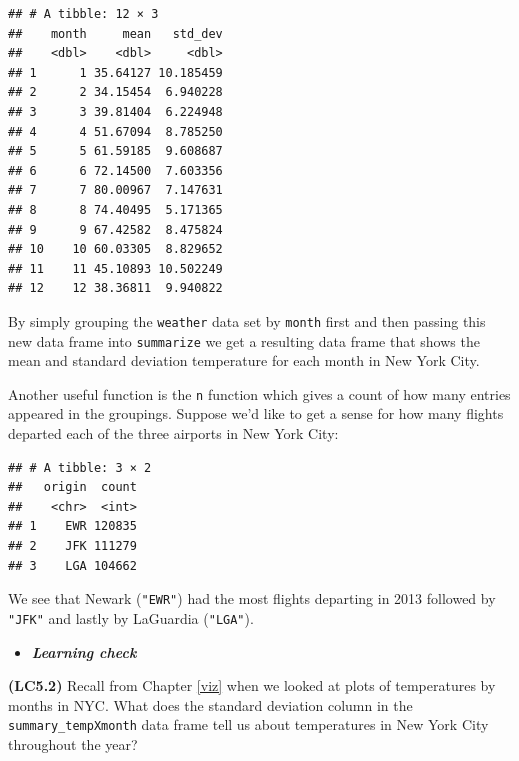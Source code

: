 \documentclass[]{tufte-book}
\newenvironment{Shaded}{\begin{snugshade}}{\end{snugshade}}
\newcommand{\KeywordTok}[1]{\textcolor[rgb]{0.13,0.29,0.53}{\textbf{{#1}}}}
\newcommand{\DataTypeTok}[1]{\textcolor[rgb]{0.13,0.29,0.53}{{#1}}}
\newcommand{\StringTok}[1]{\textcolor[rgb]{0.31,0.60,0.02}{{#1}}}
\newcommand{\NormalTok}[1]{{#1}}
\newenvironment{rmdblock}[1]
  {\begin{shaded*}
  \begin{itemize}
  \renewcommand{\labelitemi}{
    \raisebox{-.7\height}[0pt][0pt]{
    }
  }
  \item
  }
  {
  \end{itemize}
  \end{shaded*}
  }
\newenvironment{learncheck}
  {\begin{rmdblock}{warning}}
  {\end{rmdblock}}
\begin{document}
\begin{verbatim}
## # A tibble: 12 × 3
##    month     mean   std_dev
##    <dbl>    <dbl>     <dbl>
## 1      1 35.64127 10.185459
## 2      2 34.15454  6.940228
## 3      3 39.81404  6.224948
## 4      4 51.67094  8.785250
## 5      5 61.59185  9.608687
## 6      6 72.14500  7.603356
## 7      7 80.00967  7.147631
## 8      8 74.40495  5.171365
## 9      9 67.42582  8.475824
## 10    10 60.03305  8.829652
## 11    11 45.10893 10.502249
## 12    12 38.36811  9.940822
\end{verbatim}

By simply grouping the \texttt{weather} data set by \texttt{month} first
and then passing this new data frame into \texttt{summarize} we get a
resulting data frame that shows the mean and standard deviation
temperature for each month in New York City.

Another useful function is the \texttt{n} function which gives a count
of how many entries appeared in the groupings. Suppose we'd like to get
a sense for how many flights departed each of the three airports in New
York City:

\begin{Shaded}
\end{Shaded}

\begin{verbatim}
## # A tibble: 3 × 2
##   origin  count
##    <chr>  <int>
## 1    EWR 120835
## 2    JFK 111279
## 3    LGA 104662
\end{verbatim}

We see that Newark (\texttt{"EWR"}) had the most flights departing in
2013 followed by \texttt{"JFK"} and lastly by LaGuardia
(\texttt{"LGA"}).

\begin{learncheck}
\textbf{\emph{Learning check}}
\end{learncheck}

\textbf{(LC5.2)} Recall from Chapter \ref{viz} when we looked at plots
of temperatures by months in NYC. What does the standard deviation
column in the \texttt{summary\_tempXmonth} data frame tell us about
temperatures in New York City throughout the year?
\end{document}
